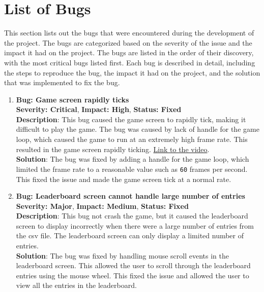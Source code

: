 \section{List of Bugs}
\label{sec:bugs-list}

\hspace{1cm} This section lists out the bugs that were encountered during the development of the project. The bugs are categorized based on the severity of the issue and the impact it had on the project. The bugs are listed in the order of their discovery, with the most critical bugs listed first. Each bug is described in detail, including the steps to reproduce the bug, the impact it had on the project, and the solution that was implemented to fix the bug.

\begin{enumerate}
    \item \textbf{Bug: Game screen rapidly ticks} 
    \\ \textbf{Severity: Critical}, \textbf{Impact: High}, \textbf{Status: Fixed}
    \\ \textbf{Description}: This bug caused the game screen to rapidly tick, making it difficult to play the game. The bug was caused by lack of handle for the game loop, which caused the game to run at an extremely high frame rate. This resulted in the game screen rapidly ticking. \href{https://youtu.be/yJd1IkAmf3o}{Link to the video}.
    \\ \textbf{Solution}: The bug was fixed by adding a handle for the game loop, which limited the frame rate to a reasonable value such as \texttt{60} frames per second. This fixed the issue and made the game screen tick at a normal rate.
    
    \item \textbf{Bug: Leaderboard screen cannot handle large number of entries}
    \\ \textbf{Severity: Major}, \textbf{Impact: Medium}, \textbf{Status: Fixed}
    \\ \textbf{Description}: This bug not crash the game, but it caused the leaderboard screen to display incorrectly when there were a large number of entries from the csv file. The leaderboard screen can only display a limited number of entries.
    \\ \textbf{Solution}: The bug was fixed by handling mouse scroll events in the leaderboard screen. This allowed the user to scroll through the leaderboard entries using the mouse wheel. This fixed the issue and allowed the user to view all the entries in the leaderboard.
    

\end{enumerate}
